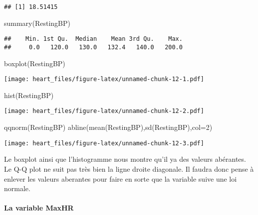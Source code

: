 \documentclass[
]{article}
\newenvironment{Shaded}{\begin{snugshade}}{\end{snugshade}}
\newcommand{\AttributeTok}[1]{\textcolor[rgb]{0.77,0.63,0.00}{#1}}
\newcommand{\DecValTok}[1]{\textcolor[rgb]{0.00,0.00,0.81}{#1}}
\newcommand{\FunctionTok}[1]{\textcolor[rgb]{0.00,0.00,0.00}{#1}}
\newcommand{\NormalTok}[1]{#1}
\begin{document}
\begin{verbatim}
## [1] 18.51415
\end{verbatim}

\begin{Shaded}
\begin{Highlighting}[]
\FunctionTok{summary}\NormalTok{(RestingBP)}
\end{Highlighting}
\end{Shaded}

\begin{verbatim}
##    Min. 1st Qu.  Median    Mean 3rd Qu.    Max. 
##     0.0   120.0   130.0   132.4   140.0   200.0
\end{verbatim}

\begin{Shaded}
\begin{Highlighting}[]
\FunctionTok{boxplot}\NormalTok{(RestingBP)}
\end{Highlighting}
\end{Shaded}

\texttt{[image: heart\_files/figure-latex/unnamed-chunk-12-1.pdf]}

\begin{Shaded}
\begin{Highlighting}[]
\FunctionTok{hist}\NormalTok{(RestingBP)}
\end{Highlighting}
\end{Shaded}

\texttt{[image: heart\_files/figure-latex/unnamed-chunk-12-2.pdf]}

\begin{Shaded}
\begin{Highlighting}[]
\FunctionTok{qqnorm}\NormalTok{(RestingBP)}
\FunctionTok{abline}\NormalTok{(}\FunctionTok{mean}\NormalTok{(RestingBP),}\FunctionTok{sd}\NormalTok{(RestingBP),}\AttributeTok{col=}\DecValTok{2}\NormalTok{)}
\end{Highlighting}
\end{Shaded}

\texttt{[image: heart\_files/figure-latex/unnamed-chunk-12-3.pdf]}

Le boxplot ainsi que l'histogramme nous montre qu'il ya des valeurs
abérantes. Le Q-Q plot ne suit pas très bien la ligne droite diagonale.
Il faudra donc pense à enlever les valeurs aberantes pour faire en sorte
que la variable suive une loi normale.

\hypertarget{la-variable-maxhr}{%
\paragraph{\texorpdfstring{La variable
\textbf{MaxHR}}{La variable MaxHR}}\label{la-variable-maxhr}}
\end{document}
